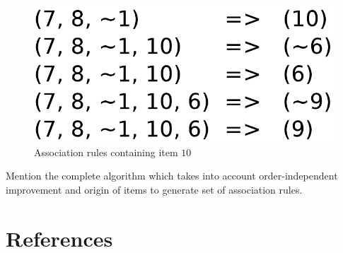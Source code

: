 \documentclass[review]{elsarticle}
\begin{document}
\begin{figure}
\begin{center}
\includegraphics[scale=0.35]{pdf/arules10}
\end{center}
\caption{Association rules containing item $ 10 $}
\label{Fig 10}
\end{figure}

Mention the complete algorithm which takes into account order-independent improvement and origin of items to generate set of association rules.

\section*{References}


\end{document}
